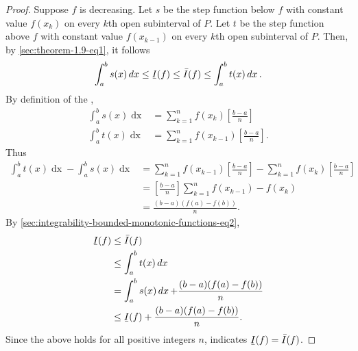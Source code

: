 \documentclass{report}
\begin{document}
\begin{proof}
    Suppose $f$ is decreasing.
    Let $s$ be the step function below $f$ with constant value $f(x_k)$
      on every $k$th open subinterval of $P$.
    Let $t$ be the step function above $f$ with constant value $f(x_{k-1})$
      on every $k$th open subinterval of $P$.
    Then, by \eqref{sec:theorem-1.9-eq1}, it follows
      \begin{equation}
        \label{sec:integrability-bounded-monotonic-functions-eq2}
        \int_a^b s(x) \mathop{dx} \leq \ubar{I}(f)
          \leq \bar{I}(f) \leq \int_a^b t(x) \mathop{dx}.
      \end{equation}
    By definition of the ,
      \begin{align*}
        \int_a^b s(x) \mathop{dx}
          & = \sum_{k=1}^n f(x_k)\left[\frac{b - a}{n}\right] \\
        \int_a^b t(x) \mathop{dx}
          & = \sum_{k=1}^n f(x_{k-1})\left[\frac{b - a}{n}\right].
      \end{align*}
    Thus
      \begin{align*}
        \int_a^b t(x) \mathop{dx} - \int_a^b s(x) \mathop{dx}
          & = \sum_{k=1}^n f(x_{k-1})\left[\frac{b - a}{n}\right] -
              \sum_{k=1}^n f(x_k)\left[\frac{b - a}{n}\right] \\
          & = \left[\frac{b - a}{n}\right] \sum_{k=1}^n f(x_{k-1}) - f(x_k) \\
          & = \frac{(b - a)(f(a) - f(b))}{n}.
      \end{align*}
    By \eqref{sec:integrability-bounded-monotonic-functions-eq2},
      \begin{align*}
        \ubar{I}(f)
          & \leq \bar{I}(f) \\
          & \leq \int_a^b t(x) \mathop{dx} \\
          & = \int_a^b s(x) \mathop{dx} + \frac{(b - a)(f(a) - f(b))}{n} \\
          & \leq \ubar{I}(f) + \frac{(b - a)(f(a) - f(b))}{n}.
      \end{align*}
    Since the above holds for all positive integers $n$,
       indicates $\ubar{I}(f) = \bar{I}(f)$.

\end{proof}

\section{}%
\label{sec:calculation-integral-bounded-monotonic-function}
\label{sec:theorem-1.13}
\end{document}
